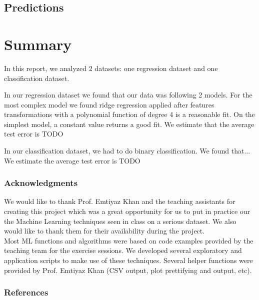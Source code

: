 \documentclass{article} %
\begin{document}
  \subsection{Predictions}


\section{Summary}
In this report, we analyzed 2 datasets: one regression dataset and one classification dataset. 

In our regression dataset we found that our data was following 2 models. For the most complex model we found ridge regression applied after features transformations with a polynomial function of degree 4 is a reasonable fit. On the simplest model, a constant value returns a good fit. We estimate that the average test error is TODO

In our classification dataset, we had to do binary classification. We found that... We estimate the average test error is TODO

\subsubsection*{Acknowledgments}
  We would like to thank Prof. Emtiyaz Khan and the teaching assistants for creating this project which was a great opportunity for us to put in practice our the Machine Learning techniques seen in class on a serious dataset. We also would like to thank them for their availability during the project.\\
  Most ML functions and algorithms were based on code examples provided by the teaching team for the exercise sessions. We developed several exploratory and application scripts to make use of these techniques. Several helper functions were provided by Prof. Emtiyaz Khan (CSV output, plot prettifying and output, etc).
  
\subsubsection*{References}
\end{document}
